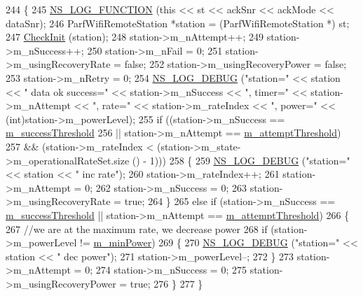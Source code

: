 \begin{DoxyCode}
244 \{
245   \hyperlink{log-macros-disabled_8h_a90b90d5bad1f39cb1b64923ea94c0761}{NS\_LOG\_FUNCTION} (\textcolor{keyword}{this} << st << ackSnr << ackMode << dataSnr);
246   ParfWifiRemoteStation *station = (ParfWifiRemoteStation *) st;
247   \hyperlink{classns3_1_1ParfWifiManager_a2a7ea7d1accf1ce9056c91929db2e7eb}{CheckInit} (station);
248   station->m\_nAttempt++;
249   station->m\_nSuccess++;
250   station->m\_nFail = 0;
251   station->m\_usingRecoveryRate = \textcolor{keyword}{false};
252   station->m\_usingRecoveryPower = \textcolor{keyword}{false};
253   station->m\_nRetry = 0;
254   \hyperlink{group__logging_ga413f1886406d49f59a6a0a89b77b4d0a}{NS\_LOG\_DEBUG} (\textcolor{stringliteral}{"station="} << station << \textcolor{stringliteral}{" data ok success="} << station->m\_nSuccess << \textcolor{stringliteral}{",
       timer="} << station->m\_nAttempt << \textcolor{stringliteral}{", rate="} << station->m\_rateIndex << \textcolor{stringliteral}{", power="} << (\textcolor{keywordtype}{int})station->m\_powerLevel);
255   \textcolor{keywordflow}{if} ((station->m\_nSuccess == \hyperlink{classns3_1_1ParfWifiManager_a20cddc69111e0c419ae3f4c36e4d4548}{m\_successThreshold}
256        || station->m\_nAttempt == \hyperlink{classns3_1_1ParfWifiManager_aab9760bab8628fc4822c12b2dd2bf0ea}{m\_attemptThreshold})
257       && (station->m\_rateIndex < (station->m\_state->m\_operationalRateSet.size () - 1)))
258     \{
259       \hyperlink{group__logging_ga413f1886406d49f59a6a0a89b77b4d0a}{NS\_LOG\_DEBUG} (\textcolor{stringliteral}{"station="} << station << \textcolor{stringliteral}{" inc rate"});
260       station->m\_rateIndex++;
261       station->m\_nAttempt = 0;
262       station->m\_nSuccess = 0;
263       station->m\_usingRecoveryRate = \textcolor{keyword}{true};
264     \}
265   \textcolor{keywordflow}{else} \textcolor{keywordflow}{if} (station->m\_nSuccess == \hyperlink{classns3_1_1ParfWifiManager_a20cddc69111e0c419ae3f4c36e4d4548}{m\_successThreshold} || station->m\_nAttempt == 
      \hyperlink{classns3_1_1ParfWifiManager_aab9760bab8628fc4822c12b2dd2bf0ea}{m\_attemptThreshold})
266     \{
267       \textcolor{comment}{//we are at the maximum rate, we decrease power}
268       \textcolor{keywordflow}{if} (station->m\_powerLevel != \hyperlink{classns3_1_1ParfWifiManager_a24ec3d3ef17fc4bc51d25d95c5e03a9b}{m\_minPower})
269         \{
270           \hyperlink{group__logging_ga413f1886406d49f59a6a0a89b77b4d0a}{NS\_LOG\_DEBUG} (\textcolor{stringliteral}{"station="} << station << \textcolor{stringliteral}{" dec power"});
271           station->m\_powerLevel--;
272         \}
273       station->m\_nAttempt = 0;
274       station->m\_nSuccess = 0;
275       station->m\_usingRecoveryPower = \textcolor{keyword}{true};
276     \}
277 \}
\end{DoxyCode}
